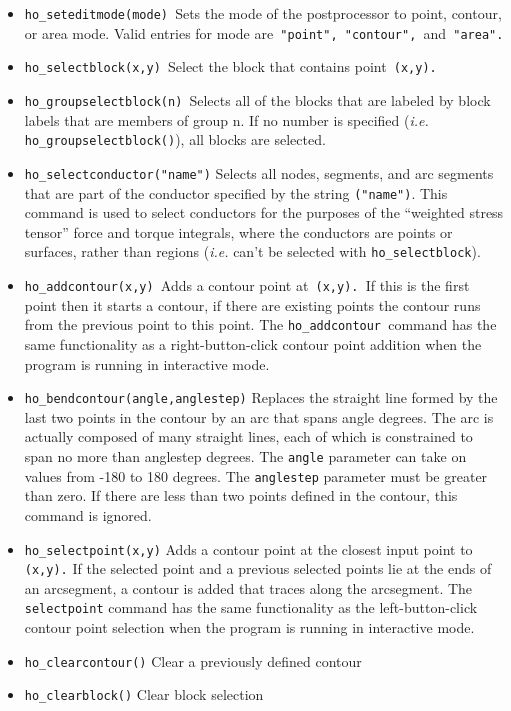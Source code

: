 \begin{itemize}
\item \texttt{ho\_seteditmode(mode) }Sets the mode of the postprocessor to point,
contour, or area mode. Valid entries for mode are\texttt{ "point",
"contour", }and\texttt{ "area". }

\item \texttt{ho\_selectblock(x,y) }Select the block that contains point\texttt{
(x,y).}

\item \texttt{ho\_groupselectblock(n) }Selects all of the blocks that are labeled by
block labels that are members of group n. If no number is specified
({\em i.e.} \texttt{ho\_groupselectblock()}), all blocks are selected.

\item \texttt{ho\_selectconductor("name")} Selects all nodes, segments, and arc
segments that are part of the conductor specified by the string
\texttt{("name")}. This command is used to select conductors for the
purposes of the ``weighted stress tensor'' force and torque
integrals, where the conductors are points or surfaces, rather than
regions ({\em i.e.} can't be selected with \texttt{ho\_selectblock}).

\item \texttt{ho\_addcontour(x,y) }Adds a contour point at\texttt{ (x,y). }If this is
the first point then it starts a contour, if there are existing
points the contour runs from the previous point to this point. The
\texttt{ho\_addcontour }command has the same functionality as a
right-button-click contour point addition when the program is
running in interactive mode.\texttt{ }

\item \texttt{ho\_bendcontour(angle,anglestep)} Replaces the straight line formed by
the last two points in the contour by an arc that spans angle
degrees. The arc is actually composed of many straight lines, each
of which is constrained to span no more than anglestep degrees. The
\texttt{angle} parameter can take on values from -180 to 180
degrees. The \texttt{anglestep} parameter must be greater than
zero. If there are less than two points defined in the contour,
this command is ignored.

\item \texttt{ho\_selectpoint(x,y)} Adds a contour point at the closest input point to
\texttt{(x,y).} If the selected point and a previous selected points lie at
the ends of an arcsegment, a contour is added that traces along the
arcsegment. The \texttt{selectpoint} command has the same
functionality as the left-button-click contour point selection when
the program is running in interactive mode.

\item \texttt{ho\_clearcontour()} Clear a previously defined contour

\item \texttt{ho\_clearblock()} Clear block selection
\end{itemize}



